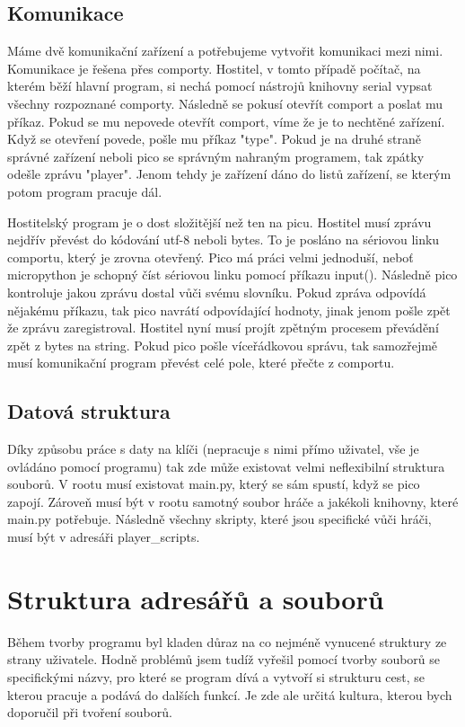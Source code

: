 \documentclass[12pt,a4paper]{article}
\begin{document}
\subsection{Komunikace}
Máme dvě komunikační zařízení a potřebujeme vytvořit komunikaci mezi nimi. Komunikace je řešena přes comporty. Hostitel, v tomto případě počítač, na kterém běží hlavní program, si nechá pomocí nástrojů knihovny serial vypsat všechny rozpoznané comporty. Následně se pokusí otevřít comport a poslat mu příkaz. Pokud se mu nepovede otevřít comport, víme že je to nechtěné zařízení. Když se otevření povede, pošle mu příkaz "type". Pokud je na druhé straně správné zařízení neboli pico se správným nahraným programem, tak zpátky odešle zprávu "player". Jenom tehdy je zařízení dáno do listů zařízení, se kterým potom program pracuje dál.

Hostitelský program je o dost složitější než ten na picu. Hostitel musí zprávu nejdřív převést do kódování utf-8 neboli bytes. To je posláno na sériovou linku comportu, který je zrovna otevřený. Pico má práci velmi jednoduší, neboť micropython je schopný číst sériovou linku pomocí příkazu input(). Následně pico kontroluje jakou zprávu dostal vůči svému slovníku. Pokud zpráva odpovídá nějakému příkazu, tak pico navrátí odpovídající hodnoty, jinak jenom pošle zpět že zprávu zaregistroval. Hostitel nyní musí projít zpětným procesem převádění zpět z bytes na string. Pokud pico pošle víceřádkovou správu, tak samozřejmě musí komunikační program převést celé pole, které přečte z comportu. 

\subsection{Datová struktura}
Díky způsobu práce s daty na klíči (nepracuje s nimi přímo uživatel, vše je ovládáno pomocí programu) tak zde může existovat velmi neflexibilní struktura souborů. V rootu musí existovat main.py, který se sám spustí, když se pico zapojí. Zároveň musí být v rootu samotný soubor hráče a jakékoli knihovny, které main.py potřebuje. Následně všechny skripty, které jsou specifické vůči hráči, musí být v adresáři player\_scripts.

\newpage
\section{Struktura adresářů a souborů}
Během tvorby programu byl kladen důraz na co nejméně vynucené struktury ze strany uživatele. Hodně problémů jsem tudíž vyřešil pomocí tvorby souborů se specifickými názvy, pro které se program dívá a vytvoří si strukturu cest, se kterou pracuje a podává do dalších funkcí. Je zde ale určitá kultura, kterou bych doporučil při tvoření souborů.
\end{document}
